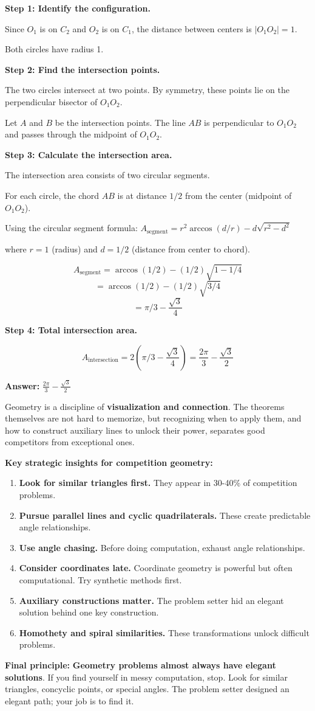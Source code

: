 ﻿\documentclass[12pt]{extarticle}
\begin{document}
\begin{solutionbox}
\textbf{Step 1: Identify the configuration.}

Since $O_1$ is on $C_2$ and $O_2$ is on $C_1$, the distance between centers is $|O_1O_2| = 1$.

Both circles have radius 1.

\textbf{Step 2: Find the intersection points.}

The two circles intersect at two points. By symmetry, these points lie on the perpendicular bisector of $O_1O_2$.

Let $A$ and $B$ be the intersection points. The line $AB$ is perpendicular to $O_1O_2$ and passes through the midpoint of $O_1O_2$.

\textbf{Step 3: Calculate the intersection area.}

The intersection area consists of two circular segments.

For each circle, the chord $AB$ is at distance $1/2$ from the center (midpoint of $O_1O_2$).

Using the circular segment formula: $A_{\text{segment}} = r^2 \arccos(d/r) - d\sqrt{r^2 - d^2}$

where $r = 1$ (radius) and $d = 1/2$ (distance from center to chord).

\[A_{\text{segment}} = \arccos(1/2) - (1/2)\sqrt{1 - 1/4}\]
\[= \arccos(1/2) - (1/2)\sqrt{3/4}\]
\[= \pi/3 - \frac{\sqrt{3}}{4}\]

\textbf{Step 4: Total intersection area.}

\[A_{\text{intersection}} = 2 \left(\pi/3 - \frac{\sqrt{3}}{4}\right) = \frac{2\pi}{3} - \frac{\sqrt{3}}{2}\]

\textbf{Answer:} $\boxed{\frac{2\pi}{3} - \frac{\sqrt{3}}{2}}$
\end{solutionbox}

Geometry is a discipline of \textbf{visualization and connection}. The theorems themselves are not hard to memorize, but recognizing when to apply them, and how to construct auxiliary lines to unlock their power, separates good competitors from exceptional ones.

\textbf{Key strategic insights for competition geometry:}

\begin{enumerate}
    \item \textbf{Look for similar triangles first.} They appear in 30-40\% of competition problems.
    \item \textbf{Pursue parallel lines and cyclic quadrilaterals.} These create predictable angle relationships.
    \item \textbf{Use angle chasing.} Before doing computation, exhaust angle relationships.
    \item \textbf{Consider coordinates late.} Coordinate geometry is powerful but often computational. Try synthetic methods first.
    \item \textbf{Auxiliary constructions matter.} The problem setter hid an elegant solution behind one key construction.
    \item \textbf{Homothety and spiral similarities.} These transformations unlock difficult problems.
\end{enumerate}

\textbf{Final principle:} \textbf{Geometry problems almost always have elegant solutions}. If you find yourself in messy computation, stop. Look for similar triangles, concyclic points, or special angles. The problem setter designed an elegant path; your job is to find it.
\end{document}
